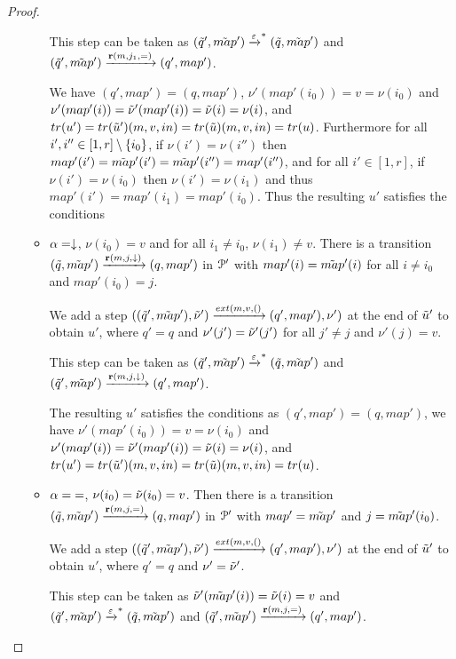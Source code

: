 \begin{proof}
\begin{itemize}
\begin{itemize}
			This step can be taken as $(\Tilde{q}', \Tilde{map}') \xrightarrow{\varepsilon}^* (\Tilde{q}, \Tilde{map}')$ and $(\Tilde{q}', \Tilde{map}') \xrightarrow{\textbf{r}(m, j_1, {=})} (q', map')$. 
			
			We have $(q', map') = (q, map')$, $\nu'(map'(i_0)) = v = \nu(i_0)$ and $\nu'(map'(i)) = \Tilde{\nu}'(map'(i)) = \Tilde{\nu}(i) = \nu(i)$, and $\trace{u'} = \trace{\Tilde{u}'} (m,v,in) = \trace{\Tilde{u}} (m,v,in) = \trace{u}$.
			Furthermore for all $i', i'' \in [1,r]\setminus\{i_0\}$, if $\nu(i') = \nu(i'')$ then $map'(i') = \Tilde{map}'(i') = \Tilde{map}'(i'') = map'(i'')$, and for all $i' \in [1,r]$, if $\nu(i')=\nu(i_0)$ then $\nu(i')=\nu(i_1)$ and thus $map'(i') = map'(i_1) = map'(i_0)$.
			Thus the resulting $u'$ satisfies the conditions
			
			\item $\alpha=\downarrow$, $\nu(i_0) = v$ and for all $i_1 \neq i_0$, $\nu(i_1) \neq v$. 
			There is a transition $(\Tilde{q}, \Tilde{map}') \xrightarrow{\textbf{r}(m, j, \downarrow)} (q, map')$ in $\mathcal{P}'$ with $map'(i) = \Tilde{map}'(i)$ for all $i\neq i_0$ and $map'(i_0) = j$.
			
			We add a step $((\Tilde{q}', \Tilde{map}'), \Tilde{\nu}') \extbr{m, v} ((q', map'), \nu')$ at the end of $\Tilde{u}'$ to obtain $u'$, where $q' = q$ and $\nu'(j') = \Tilde{\nu}'(j')$ for all $j' \neq j$ and $\nu'(j) = v$.
			
			This step can be taken as $(\Tilde{q}', \Tilde{map}') \xrightarrow{\varepsilon}^* (\Tilde{q}, \Tilde{map}')$ and $(\Tilde{q}', \Tilde{map}') \xrightarrow{\textbf{r}(m, j, \downarrow)} (q', map')$. 
			
			The resulting $u'$ satisfies the conditions as $(q', map') = (q, map')$, we have $\nu'(map'(i_0)) = v = \nu(i_0)$ and $\nu'(map'(i)) = \Tilde{\nu}'(map'(i)) = \Tilde{\nu}(i) = \nu(i)$, and $\trace{u'} = \trace{\Tilde{u}'} (m,v,in) = \trace{\Tilde{u}} (m,v,in) = \trace{u}$.
			
			\item $\alpha = {=}$, $\nu(i_0) = \Tilde{\nu}(i_0) = v$. Then there is a transition $(\Tilde{q}, \Tilde{map}') \xrightarrow{\textbf{r}(m, j, {=})} (q, map')$ in $\mathcal{P}'$ with $map' = \Tilde{map}'$ and $j = \Tilde{map}'(i_0)$.
			
			We add a step $((\Tilde{q}', \Tilde{map}'), \Tilde{\nu}') \extbr{m, v} ((q', map'), \nu')$ at the end of $\Tilde{u}'$ to obtain $u'$, where $q' = q$ and $\nu' = \Tilde{\nu}'$.
			
			This step can be taken as $\Tilde{\nu}'(\Tilde{map}'(i)) = \Tilde{\nu}(i) = v$ and $(\Tilde{q}', \Tilde{map}') \xrightarrow{\varepsilon}^* (\Tilde{q}, \Tilde{map}')$ and $(\Tilde{q}', \Tilde{map}') \xrightarrow{\textbf{r}(m, j, {=})} (q', map')$.
			

\end{itemize}
\end{itemize}
\end{proof}
